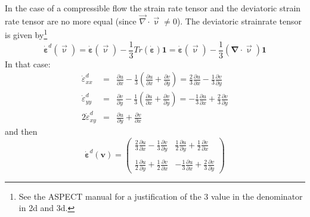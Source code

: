 In the case of a compressible flow the strain rate tensor and the deviatoric strain 
rate tensor are no more equal (since ${\vec\nabla}\cdot\vec{\upnu} \neq 0$).
The deviatoric strainrate tensor is given by\footnote{See the ASPECT manual for a 
justification of the 3 value in the denominator in 2d and 3d.} 
\[
\dot{\bm \varepsilon}^d(\vec{\upnu})=
\dot{\bm \varepsilon}(\vec{\upnu})-\frac{1}{3} Tr(\dot{\bm \varepsilon}) {\bm 1}
=\dot{\bm \varepsilon}(\vec{\upnu})-\frac{1}{3} ({\bm \nabla}\cdot \vec{\upnu}) {\bm 1}
\]
In that case:
\begin{eqnarray}
\dot{\varepsilon}_{xx}^d 
&=& \frac{\partial u}{\partial x}
-\frac{1}{3} \left( \frac{\partial u}{\partial x} + \frac{\partial v}{\partial y} \right) 
= \frac{2}{3}\frac{\partial u}{\partial x}
-\frac{1}{3} \frac{\partial v}{\partial y}
\\
\dot{\varepsilon}_{yy}^d 
&=& \frac{\partial v}{\partial y}
-\frac{1}{3} \left( \frac{\partial u}{\partial x} + \frac{\partial v}{\partial y} \right) 
=-\frac{1}{3} \frac{\partial u}{\partial x} 
+ \frac{2}{3} \frac{\partial v}{\partial y} 
\\
2\dot{\varepsilon}_{xy}^d 
&=& 
\frac{\partial u}{\partial y} 
+\frac{\partial v}{\partial x} 
\end{eqnarray}
and then 
\[
\dot{\bm \varepsilon}^d({\bm v})
=
\left(
\begin{array}{cc}
\frac{2}{3} \frac{\partial u}{\partial x} -\frac{1}{3} \frac{\partial v}{\partial y} &
\frac{1}{2}\frac{\partial u}{\partial y} + \frac{1}{2}\frac{\partial v}{\partial x}  \\ \\
\frac{1}{2}\frac{\partial u}{\partial y} + \frac{1}{2}\frac{\partial v}{\partial x}  &
-\frac{1}{3} \frac{\partial u}{\partial x} +\frac{2}{3} \frac{\partial v}{\partial y} 
\end{array}
\right)
\]

